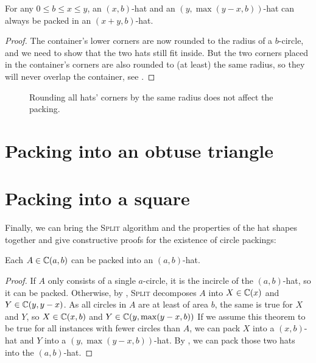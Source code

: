 \documentclass[%
    a4paper,              %
    style=print,          %
    bibliography=totoc,   %
    nexus,                %
    lnum,                 %
    extramargin,          %
]{tubsbook}
\begin{document}
\begin{theorem}\label{th:roundedhatsinhat}
    For any $0 \le b \le x \le y$, an $(x,b)$-hat and an $(y,\max(y-x,b))$-hat can always be packed in an $(x+y,b)$-hat.
\end{theorem}

\begin{proof}
    The container's lower corners are now rounded to the radius of a $b$-circle, and we need to show that the two hats still fit inside. But the two corners placed in the container's corners are also rounded to (at least) the same radius, so they will never overlap the container, see .
\end{proof}

\begin{figure}[htb]
    \centering


    \caption{Rounding all hats' corners by the same radius does not affect the packing.}
    \label{fig:rounding-hats}
\end{figure}

\chapter{Packing into an obtuse triangle}

\chapter{Packing into a square}

Finally, we can bring the \textsc{Split} algorithm and the properties of the hat shapes together and give constructive proofs for the existence of circle packings:

\begin{theorem}\label{th:circlesinhat}
    Each $A \in \mathbb{C}(a,b)$ can be packed into an $(a,b)$-hat.
\end{theorem}

\begin{proof}
    If $A$ only consists of a single $a$-circle, it is the incircle of the $(a,b)$-hat, so it can be packed. Otherwise, by , \textsc{Split} decomposes $A$ into $X \in \mathbb{C}(x)$ and $Y \in \mathbb{C}(y,y-x)$. As all circles in $A$ are at least of area $b$, the same is true for $X$ and $Y$, so $X \in \mathbb{C}(x,b)$ and $Y \in \mathbb{C}(y,\max(y-x,b))$
    If we assume this theorem to be true for all instances with fewer circles than $A$, we can pack $X$ into a $(x,b)$-hat and $Y$ into a $(y,\max(y-x,b))$-hat. By , we can pack those two hats into the $(a,b)$-hat.
\end{proof}
\end{document}
